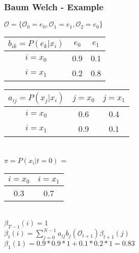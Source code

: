 \begin{frame}
	\frametitle{Baum Welch - Example}
  \begin{table}
  \centering
  $\mathcal{O} = \{\mathcal{O}_0 = e_0, \mathcal{O}_1 = e_1, \mathcal{O}_2 = e_0\}$\\
  \begin{tabular}{| c | c | c |}
  	\hline
    $b_{ik} = P(e_k|x_i)$ & $e_0$ & $e_1$ \\ \hline
    $i = x_0$                 & 0.9   & 0.1   \\ \hline
    $i = x_1$                 & 0.2   & 0.8   \\ \hline
  \end{tabular}
  \begin{tabular}{| c | c | c |}
  	\hline
    $a_{ij} = P(x_j|x_i)$ & $j = x_0$ & $j = x_1$ \\ \hline
    $i = x_0$                 & 0.6   & 0.4   \\ \hline
    $i = x_1$                 & 0.9   & 0.1   \\ \hline
  \end{tabular}
  \\$\pi = P(x_i|t=0)$ =
  \begin{tabular}{| c | c |}
  	\hline
    $i = x_0$ & $i = x_1$ \\ \hline
    0.3   & 0.7   \\ \hline
  \end{tabular}\\
  $\beta_{T-1}(i) = 1$\\
  $\beta_t(i) = \sum\limits_{j=0}^{N-1} a_{ij} b_j(\mathcal{O}_{t+1})\beta_{t+1}(j)$\\
  $\beta_1(1) = 0.9 * 0.9 * 1 + 0.1 * 0.2 * 1 = 0.83$
\end{table}
\end{frame}

